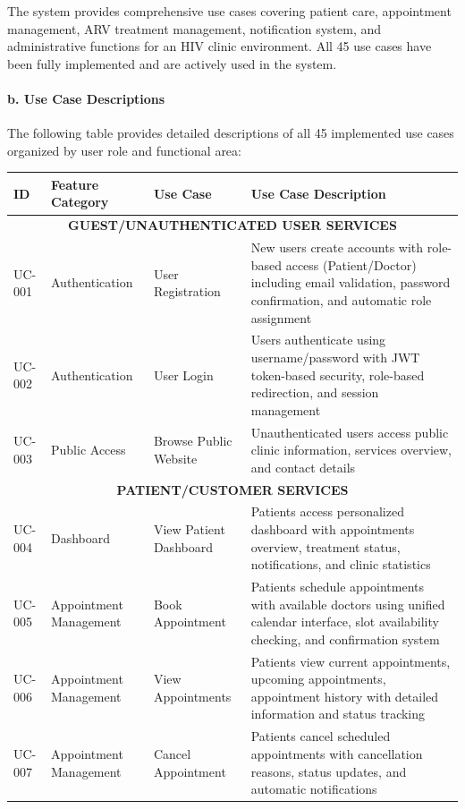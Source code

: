 \documentclass[12pt,a4paper]{article}
\begin{document}
The system provides comprehensive use cases covering patient care, appointment management, ARV treatment management, notification system, and administrative functions for an HIV clinic environment. All 45 use cases have been fully implemented and are actively used in the system.

\paragraph{b. Use Case Descriptions}

The following table provides detailed descriptions of all 45 implemented use cases organized by user role and functional area:

\begin{longtable}{|p{1cm}|p{3.5cm}|p{3.5cm}|p{6cm}|}
\hline
\textbf{ID} & \textbf{Feature Category} & \textbf{Use Case} & \textbf{Use Case Description} \\
\hline
\multicolumn{4}{|c|}{\textbf{GUEST/UNAUTHENTICATED USER SERVICES}} \\
\hline
UC-001 & Authentication & User Registration & New users create accounts with role-based access (Patient/Doctor) including email validation, password confirmation, and automatic role assignment \\
\hline
UC-002 & Authentication & User Login & Users authenticate using username/password with JWT token-based security, role-based redirection, and session management \\
\hline
UC-003 & Public Access & Browse Public Website & Unauthenticated users access public clinic information, services overview, and contact details \\
\hline
\multicolumn{4}{|c|}{\textbf{PATIENT/CUSTOMER SERVICES}} \\
\hline
UC-004 & Dashboard & View Patient Dashboard & Patients access personalized dashboard with appointments overview, treatment status, notifications, and clinic statistics \\
\hline
UC-005 & Appointment Management & Book Appointment & Patients schedule appointments with available doctors using unified calendar interface, slot availability checking, and confirmation system \\
\hline
UC-006 & Appointment Management & View Appointments & Patients view current appointments, upcoming appointments, appointment history with detailed information and status tracking \\
\hline
UC-007 & Appointment Management & Cancel Appointment & Patients cancel scheduled appointments with cancellation reasons, status updates, and automatic notifications \\

\end{longtable}
\end{document}
